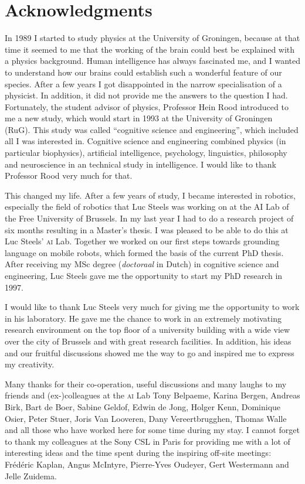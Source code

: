 \chapter*{Acknowledgments}

In 1989 I started to study physics at the University of Groningen, because at that time it seemed to me that the working of the brain could best be explained with a physics background. Human intelligence has always fascinated me, and I wanted to understand how our brains could establish such a wonderful feature of our species. After a few years I got disappointed in the narrow specialisation of a physicist. In addition, it did not provide me the answers to the question I had. Fortunately, the student advisor of physics, Professor Hein Rood introduced to me a new study, which would start in 1993 at the University of Groningen (RuG). This study was called ``cognitive science and engineering'', which included all I was interested in. Cognitive science and engineering combined physics (in particular biophysics), artificial intelligence, psychology, linguistics, philosophy and neuroscience in an technical study in intelligence. I would like to thank Professor Rood very much for that.

This changed my life. After a few years of study, I became interested in robotics, especially the field of robotics that Luc Steels was working on at the AI Lab of the Free University of Brussels. In my last year I had to do a research project of six months resulting in a Master's thesis. I was pleased to be able to do this at Luc Steels' {\scshape ai} Lab. Together we worked on our first steps towards grounding language on mobile robots, which formed the basis of the current PhD thesis. After receiving my MSc degree (\textit{doctoraal} in Dutch) in cognitive science and engineering, Luc Steels gave me the opportunity to start my PhD research in 1997.

I would like to thank Luc Steels very much for giving me the opportunity to work in his laboratory. He gave me the chance to work in an extremely motivating research environment on the top floor of a university building with a wide view over the city of Brussels and with great research facilities. In addition, his ideas and our fruitful discussions showed me the way to go and inspired me to express my creativity.

Many thanks for their co-operation, useful discussions and many laughs to my friends and (ex-)colleagues at the {\scshape ai} Lab Tony Belpaeme, Karina Bergen, Andreas Birk, Bart de Boer, Sabine Geldof, Edwin de Jong, Holger Kenn, Dominique Osier, Peter Stuer, Joris Van Looveren, Dany Vereertbrugghen, Thomas Walle and all those who have worked here for some time during my stay. I cannot forget to thank my colleagues at the Sony CSL in Paris for providing me with a lot of interesting ideas and the time spent during the inspiring off-site meetings: Fr\'ed\'eric Kaplan, Angus McIntyre, Pierre-Yves Oudeyer, Gert Westermann and Jelle Zuidema.

